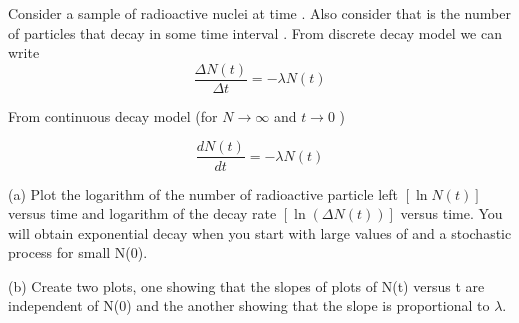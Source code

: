 \documentclass[12pt, letterpaper]{article}
\begin{document}
    Consider a sample of radioactive nuclei at time . Also consider that is the number
    of particles that decay in some time interval .
    From discrete decay model we can write
    \begin{equation}
        \frac{\Delta N(t)}{\Delta t}  = -\lambda N(t)
    \end{equation}
    
    From continuous decay model (for $N \to \infty$  and $t \to 0$ )

    \begin{equation}
        \frac{dN(t)}{dt}  = -\lambda N(t)
    \end{equation}

    (a) Plot the logarithm of the number of radioactive particle left $[\ln N(t)]$ versus time and
    logarithm of the decay rate $[\ln(\Delta N(t)) ]$ versus time. You will obtain exponential decay
    when you start with large values of and a stochastic process for small N(0).

    (b) Create two plots, one showing that the slopes of plots of N(t) versus t are independent
    of N(0) and the another showing that the slope is proportional to $\lambda$.
\end{document}
